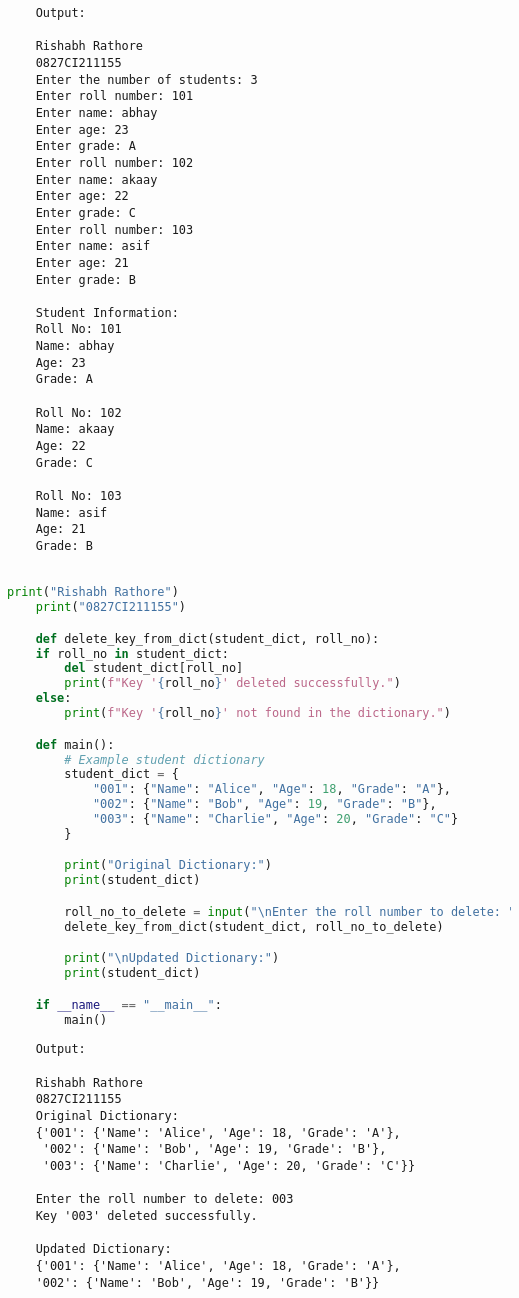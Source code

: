 \documentclass{report}
\begin{document}
\begin{verbatim}
	Output:

	Rishabh Rathore
	0827CI211155
	Enter the number of students: 3
	Enter roll number: 101
	Enter name: abhay
	Enter age: 23
	Enter grade: A
	Enter roll number: 102
	Enter name: akaay
	Enter age: 22
	Enter grade: C
	Enter roll number: 103
	Enter name: asif
	Enter age: 21
	Enter grade: B
	
	Student Information:
	Roll No: 101
	Name: abhay
	Age: 23
	Grade: A
	
	Roll No: 102
	Name: akaay
	Age: 22
	Grade: C
	
	Roll No: 103
	Name: asif
	Age: 21
	Grade: B
	

\end{verbatim}


\bigskip


\sol 
\begin{lstlisting}[language=Python]
	print("Rishabh Rathore")
	print("0827CI211155")

	def delete_key_from_dict(student_dict, roll_no):
    if roll_no in student_dict:
        del student_dict[roll_no]
        print(f"Key '{roll_no}' deleted successfully.")
    else:
        print(f"Key '{roll_no}' not found in the dictionary.")

	def main():
		# Example student dictionary
		student_dict = {
			"001": {"Name": "Alice", "Age": 18, "Grade": "A"},
			"002": {"Name": "Bob", "Age": 19, "Grade": "B"},
			"003": {"Name": "Charlie", "Age": 20, "Grade": "C"}
		}

		print("Original Dictionary:")
		print(student_dict)

		roll_no_to_delete = input("\nEnter the roll number to delete: ")
		delete_key_from_dict(student_dict, roll_no_to_delete)

		print("\nUpdated Dictionary:")
		print(student_dict)

	if __name__ == "__main__":
		main()

\end{lstlisting}

\begin{verbatim}
	Output:

	Rishabh Rathore
	0827CI211155
	Original Dictionary:
	{'001': {'Name': 'Alice', 'Age': 18, 'Grade': 'A'}, 
	 '002': {'Name': 'Bob', 'Age': 19, 'Grade': 'B'},
	 '003': {'Name': 'Charlie', 'Age': 20, 'Grade': 'C'}}

	Enter the roll number to delete: 003
	Key '003' deleted successfully.

	Updated Dictionary:
	{'001': {'Name': 'Alice', 'Age': 18, 'Grade': 'A'}, 
	'002': {'Name': 'Bob', 'Age': 19, 'Grade': 'B'}}
	

\end{verbatim}
\end{document}
